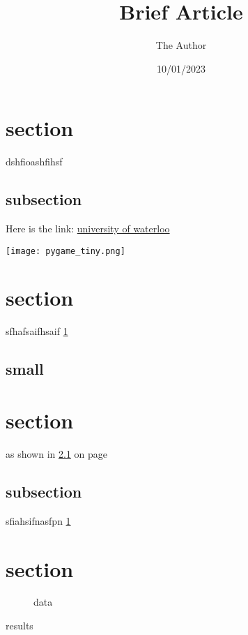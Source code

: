 \documentclass[11pt, oneside]{article}
\title{Brief Article}
\author{The Author}
\date{10/01/2023}							%
\begin{document}
\begin{appendix}
	\listoffigures
	\newpage
	\listoftables
\end{appendix}

\newpage

\tableofcontents
\newpage

\maketitle
 

\section{section}
\label{sec}
dshfioashfihsf


\subsection{subsection}
Here is the link:
\href{https://uwaterloo.ca/}{university of waterloo}

\texttt{[image: pygame\_tiny.png]}

\section{section}
sfhafsaifhsaif \ref{sec}

\subsection{small}
\label{sm}


\section{section}
as shown in \ref{sm} on page \pageref{sm}

\subsection{subsection}
sfiahsifnasfpn
\ref{sec}
 
\section{section}

\begin{figure}
	\caption{data}  
\end{figure}
\begin{table}
	\caption{results} 
\end{table}


\end{document}
